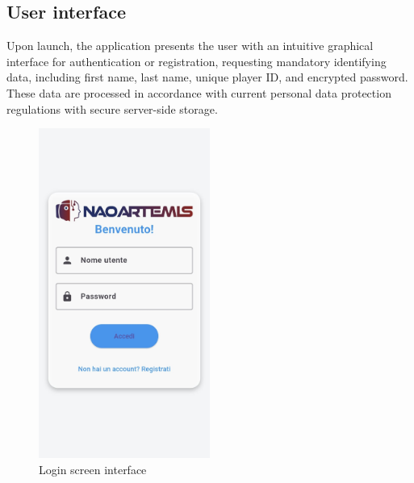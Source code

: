 \documentclass{optica-article}
\begin{document}
\subsection{User interface}
Upon launch, the application presents the user with an intuitive graphical interface for authentication or registration, requesting mandatory identifying data, including first name, last name, unique player ID, and encrypted password. These data are processed in accordance with current personal data protection regulations with secure server-side storage.
\begin{figure}[H]
    \centering
    \includegraphics[width=0.5\textwidth]{figures/creaaccount_app.jpg}
    \caption{Login screen interface}
    \label{fig:registrazione}
\end{figure}
\end{document}
